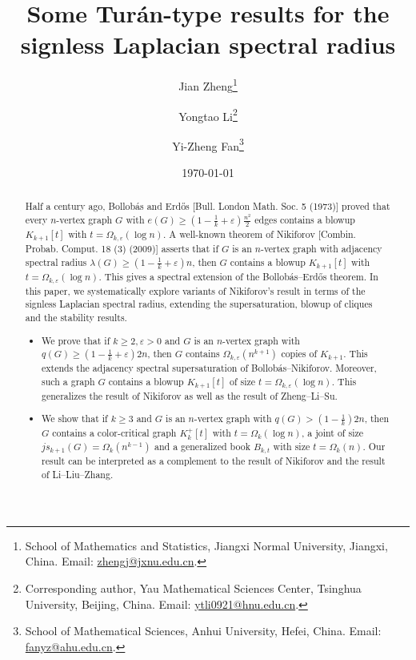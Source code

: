 \documentclass[11pt,a4paper]{article}
\title{Some Tur\'{a}n-type results for {the} signless Laplacian spectral radius}
\author{
Jian Zheng\thanks{
School of Mathematics and Statistics, Jiangxi Normal University, Jiangxi, China. 
Email: \url{zhengj@jxnu.edu.cn}. }  
 \and 
 Yongtao Li\thanks{Corresponding author, 
 Yau Mathematical Sciences Center, Tsinghua University, Beijing, China. Email: \url{ytli0921@hnu.edu.cn}.}
\and 
Yi-Zheng Fan\thanks{
School of Mathematical Sciences, Anhui University, Hefei, China. Email: \url{fanyz@ahu.edu.cn}. 
} 
}
\date{\today}
\theoremstyle{plain}
\theoremstyle{definition}
\begin{document}
\maketitle

\vspace{-1cm}

\begin{abstract}
 Half a century ago, Bollob\'{a}s and Erd\H{o}s [Bull. London Math. Soc. 5 (1973)] proved that every $n$-vertex graph $G$ with $e(G)\ge (1- \frac{1}{k} + \varepsilon )\frac{n^2}{2}$ edges contains a blowup $K_{k+1}[t]$ with $t=\Omega_{k,\varepsilon}(\log n)$. 
A well-known theorem of Nikiforov [Combin. Probab. Comput. 18 (3) (2009)] asserts 
that if $G$ is an $n$-vertex graph with adjacency spectral radius 
$\lambda (G)\ge (1- \frac{1}{k} + \varepsilon)n$, then $G$ contains a blowup $K_{k+1}[t]$ with $t=\Omega_{k,\varepsilon}(\log n)$. This gives a spectral extension of the Bollob\'{a}s--Erd\H{o}s theorem. 
 In this paper, we systematically explore variants of Nikiforov's result in terms of the signless Laplacian spectral radius, extending the supersaturation, blowup of cliques and the stability results. 

\begin{itemize}
    \item 
We prove that if $k\ge 2,\varepsilon>0$ and $G$ is an $n$-vertex graph with $q(G)\ge (1- \frac{1}{k} + \varepsilon)2n$, then $G$ contains $\Omega_{k,\varepsilon}(n^{k+1})$ copies of $K_{k+1}$. This extends the adjacency  spectral supersaturation of Bollob\'{a}s--Nikiforov. Moreover, such a graph $G$ contains a blowup $K_{k+1}[t]$ of size $t=\Omega_{k,\varepsilon}(\log n)$. {This generalizes the result of Nikiforov as well as the result of Zheng--Li--Su.}  

    \item 
    We show that if $k\ge 3$ and $G$ is an $n$-vertex graph with $q(G)> (1- \frac{1}{k})2n$,  then 
    $G$ contains a color-critical graph $K_{k}^+[t]$ with 
    $t=\Omega_k(\log n)$, a joint of size $js_{k+1}(G)=\Omega_k (n^{k-1})$ and 
    a generalized book $B_{k,t}$ with size $t=\Omega_k(n)$. 
    Our result can be interpreted as a complement to the result of Nikiforov and the result of Li--Liu--Zhang.  
    

\end{itemize}
\end{abstract}
\end{document}
